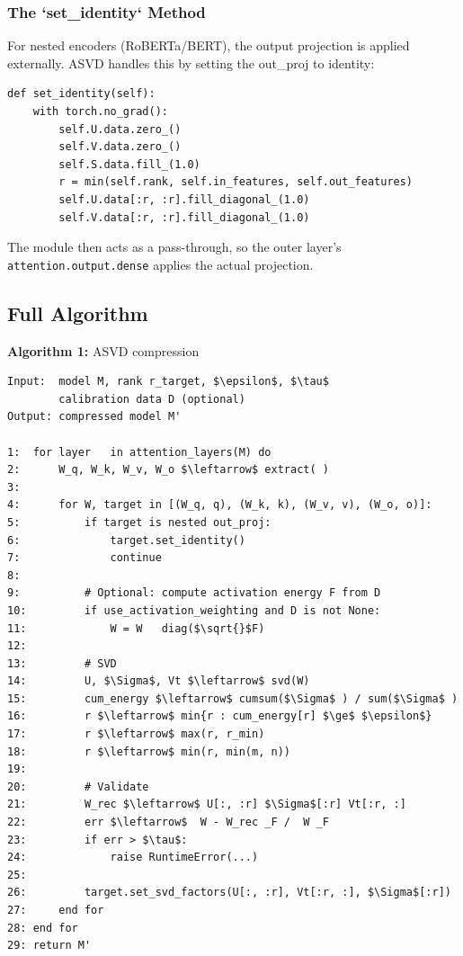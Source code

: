 \subsubsection{The `set\_identity` Method}

For nested encoders (RoBERTa/BERT), the output projection is applied 
externally. ASVD handles this by setting the out\_proj to identity:

\begin{lstlisting}
def set_identity(self):
    with torch.no_grad():
        self.U.data.zero_()
        self.V.data.zero_()
        self.S.data.fill_(1.0)
        r = min(self.rank, self.in_features, self.out_features)
        self.U.data[:r, :r].fill_diagonal_(1.0)
        self.V.data[:r, :r].fill_diagonal_(1.0)
\end{lstlisting}

The module then acts as a pass-through, so the outer layer's 
\texttt{attention.output.dense} applies the actual projection.

\subsection{Full Algorithm}

\textbf{Algorithm 1:} ASVD compression
\begin{lstlisting}
Input:  model M, rank r_target, $\epsilon$, $\tau$
        calibration data D (optional)
Output: compressed model M'

1:  for layer   in attention_layers(M) do
2:      W_q, W_k, W_v, W_o $\leftarrow$ extract( )
3:
4:      for W, target in [(W_q, q), (W_k, k), (W_v, v), (W_o, o)]:
5:          if target is nested out_proj:
6:              target.set_identity()
7:              continue
8:
9:          # Optional: compute activation energy F from D
10:         if use_activation_weighting and D is not None:
11:             W = W   diag($\sqrt{}$F)
12:
13:         # SVD
14:         U, $\Sigma$, Vt $\leftarrow$ svd(W)
15:         cum_energy $\leftarrow$ cumsum($\Sigma$ ) / sum($\Sigma$ )
16:         r $\leftarrow$ min{r : cum_energy[r] $\ge$ $\epsilon$}
17:         r $\leftarrow$ max(r, r_min)
18:         r $\leftarrow$ min(r, min(m, n))
19:
20:         # Validate
21:         W_rec $\leftarrow$ U[:, :r] $\Sigma$[:r] Vt[:r, :]
22:         err $\leftarrow$  W - W_rec _F /  W _F
23:         if err > $\tau$:
24:             raise RuntimeError(...)
25:
26:         target.set_svd_factors(U[:, :r], Vt[:r, :], $\Sigma$[:r])
27:     end for
28: end for
29: return M'
\end{lstlisting}

